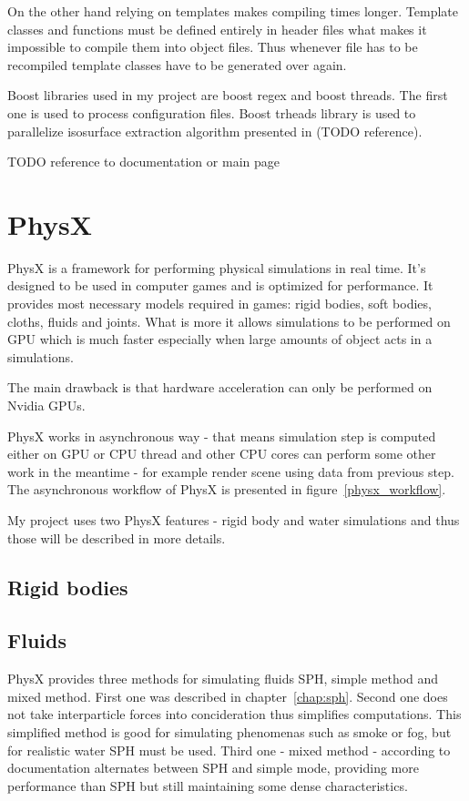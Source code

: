 On the other hand relying on templates makes compiling times longer. Template classes and functions must be defined entirely in header files what makes it impossible to compile them into object files. Thus whenever file has to be recompiled template classes have to be generated over again.

Boost libraries used in my project are boost regex and boost threads. The first one is used to process configuration files. Boost trheads library is used to parallelize isosurface extraction algorithm presented in (TODO reference).

TODO reference to documentation or main page

\section{PhysX}

PhysX is a framework for performing physical simulations in real time. It's designed to be used in computer games and is optimized for performance. It provides most necessary models required in games: rigid bodies, soft bodies, cloths, fluids and joints. What is more it allows simulations to be performed on GPU which is much faster especially when large amounts of object acts in a simulations.

The main drawback is that hardware acceleration can only be performed on Nvidia GPUs. 

PhysX works in asynchronous way - that means simulation step is computed either on GPU or CPU thread and other CPU cores can perform some other work in the meantime - for example render scene using data from previous step. The asynchronous workflow of PhysX is presented in figure~\ref{physx_workflow}.


My project uses two PhysX features - rigid body and water simulations and thus those will be described in more details. 
\subsection{Rigid bodies}


\subsection{Fluids}
PhysX provides three methods for simulating fluids SPH, simple method and mixed method. First one was described in chapter~\ref{chap:sph}. Second one does not take interparticle forces into concideration thus simplifies computations. This simplified method is good for simulating phenomenas such as smoke or fog, but for realistic water SPH must be used. Third one - mixed method - according to documentation \cite{PhysXDoc} alternates between SPH and simple mode, providing more performance than SPH but still maintaining some dense characteristics.

